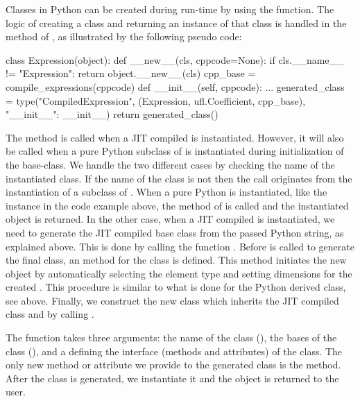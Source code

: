 Classes in Python can be created during run-time by using the
 function. The logic of creating a class and returning an
instance of that class is handled in the  method of
, as illustrated by the following pseudo code:
\begin{python}
class Expression(object):
    def __new__(cls, cppcode=None):
        if cls.__name__ != "Expression":
            return object.__new__(cls)
        cpp_base = compile_expressions(cppcode)
        def __init__(self, cppcode):
            ...
        generated_class = type("CompiledExpression",
                               (Expression, ufl.Coefficient, cpp_base),
                               {"__init__": __init__})
        return generated_class()
\end{python}
The  method is called when a JIT compiled
 is instantiated. However, it will also be called
when a pure Python subclass of  is instantiated during
initialization of the base-class. We handle the two different cases by
checking the name of the instantiated class. If the name of the class is
not  then the call originates from the instantiation
of a subclass of . When a pure Python 
is instantiated, like the  instance in the code example
above, the  method of  is called and the
instantiated object is returned.  In the other case, when a JIT compiled
 is instantiated, we need to generate the JIT compiled
base class from the passed Python string, as explained above. This
is done by calling the function . Before
 is called to generate the final class, an 
method for the class is defined. This method initiates the new object
by automatically selecting the element type and setting dimensions
for the created . This procedure is similar to what is
done for the Python derived  class, see above. Finally,
we construct the new class which inherits the JIT compiled class and
 by calling .

The  function takes three arguments: the name of the class
(), the bases of the class (), and a  defining the
interface (methods and attributes) of the class. The only new method or
attribute we provide to the generated class is the 
method. After the class is generated, we instantiate it and the object
is returned to the user.


